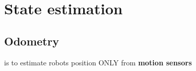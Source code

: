 \chapter{State estimation}

\section{Odometry}
    is to estimate robots position ONLY from \textbf{motion sensors}
    